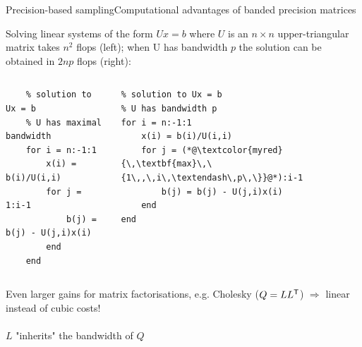 \documentclass[xcolor=svgnames, 10pt, aspectratio=169]{beamer}
\newcommand\transpose[1]{{#1}^{\sf{T}}}
\begin{document}
\begin{frame}[fragile]{Precision-based sampling}{Computational advantages of banded precision matrices}

    Solving linear systems of the form $Ux = b$ where $U$ is an $n \times n$ upper-triangular matrix takes $n^2$ flops (left); when U has bandwidth $p$ the solution can be obtained in $2 n p$ flops (right):

    \begin{columns}
        \begin{lstlisting}
    % solution to Ux = b
    % U has maximal bandwidth
    for i = n:-1:1
        x(i) = b(i)/U(i,i)
        for j = 1:i-1
            b(j) = b(j) - U(j,i)x(i)
        end
    end
        \end{lstlisting}
        \begin{lstlisting}
% solution to Ux = b
% U has bandwidth p            
for i = n:-1:1
    x(i) = b(i)/U(i,i)
    for j = (*@\textcolor{myred}{\,\textbf{max}\,\{1\,,\,i\,\textendash\,p\,\}}@*):i-1
        b(j) = b(j) - U(j,i)x(i)
    end
end
        \end{lstlisting}
    \end{columns}
    \vspace{0.3cm}

    Even larger gains for matrix factorisations, e.g. Cholesky ($Q = L\transpose{L}$) $\Longrightarrow$ linear instead of cubic costs! \\~\\

    $L$ "inherits" the bandwidth of $Q$ \citep[][Theorem 4.3.1]{golubvanloan2013}
\end{frame}
\end{document}
